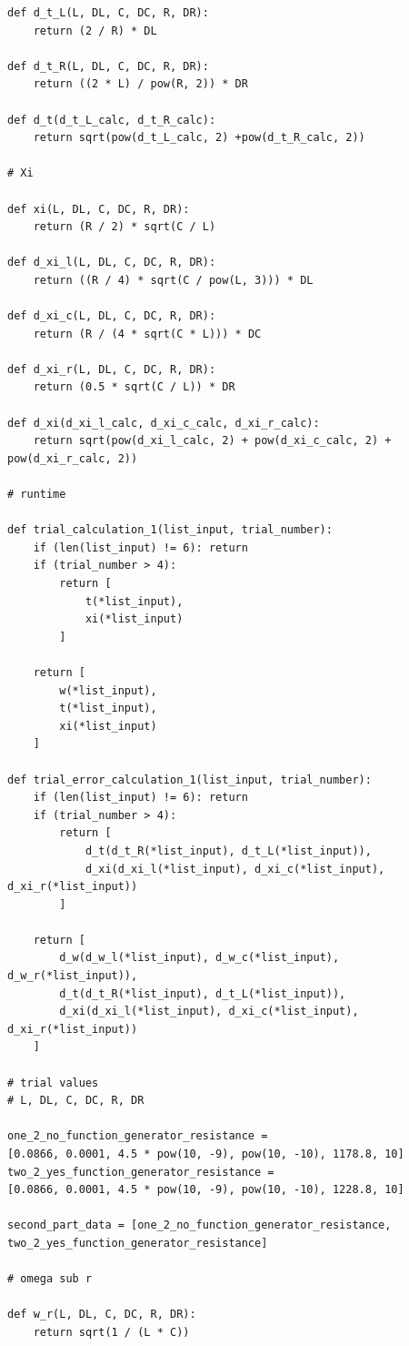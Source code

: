 \documentclass[12pt]{article}
\begin{document}
\begin{verbatim}
def d_t_L(L, DL, C, DC, R, DR):
    return (2 / R) * DL

def d_t_R(L, DL, C, DC, R, DR):
    return ((2 * L) / pow(R, 2)) * DR

def d_t(d_t_L_calc, d_t_R_calc):
    return sqrt(pow(d_t_L_calc, 2) +pow(d_t_R_calc, 2))

# Xi

def xi(L, DL, C, DC, R, DR):
    return (R / 2) * sqrt(C / L)

def d_xi_l(L, DL, C, DC, R, DR):
    return ((R / 4) * sqrt(C / pow(L, 3))) * DL

def d_xi_c(L, DL, C, DC, R, DR):
    return (R / (4 * sqrt(C * L))) * DC

def d_xi_r(L, DL, C, DC, R, DR):
    return (0.5 * sqrt(C / L)) * DR

def d_xi(d_xi_l_calc, d_xi_c_calc, d_xi_r_calc):
    return sqrt(pow(d_xi_l_calc, 2) + pow(d_xi_c_calc, 2) + pow(d_xi_r_calc, 2))

# runtime

def trial_calculation_1(list_input, trial_number):
    if (len(list_input) != 6): return
    if (trial_number > 4):
        return [
            t(*list_input),
            xi(*list_input)
        ]
    
    return [
        w(*list_input),
        t(*list_input),
        xi(*list_input)
    ]

def trial_error_calculation_1(list_input, trial_number):
    if (len(list_input) != 6): return
    if (trial_number > 4):
        return [
            d_t(d_t_R(*list_input), d_t_L(*list_input)),
            d_xi(d_xi_l(*list_input), d_xi_c(*list_input), d_xi_r(*list_input))
        ]
    
    return [
        d_w(d_w_l(*list_input), d_w_c(*list_input), d_w_r(*list_input)),
        d_t(d_t_R(*list_input), d_t_L(*list_input)),
        d_xi(d_xi_l(*list_input), d_xi_c(*list_input), d_xi_r(*list_input))
    ]

# trial values
# L, DL, C, DC, R, DR

one_2_no_function_generator_resistance = 
[0.0866, 0.0001, 4.5 * pow(10, -9), pow(10, -10), 1178.8, 10]
two_2_yes_function_generator_resistance = 
[0.0866, 0.0001, 4.5 * pow(10, -9), pow(10, -10), 1228.8, 10]

second_part_data = [one_2_no_function_generator_resistance,
two_2_yes_function_generator_resistance]

# omega sub r

def w_r(L, DL, C, DC, R, DR):
    return sqrt(1 / (L * C))


\end{verbatim}
\end{document}
